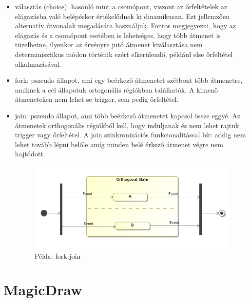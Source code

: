 \begin{itemize}
	\item választás (choice): hasonló mint a csomópont, viszont az őrfeltételek az elágazásba való belépéskor értékelődnek ki dinamikusan. Ezt jellemzően alternatív útvonalak megadására használjuk. Fontos megjegyezni, hogy az elágazás és a csomópont esetében is lehetséges, hogy több átmenet is tüzelhetne, ilyenkor az érvényre jutó átmenet kiválasztása nem determinisztikus módon történik ezért elkerülendő, például else őrfeltétel alkalmazásával.
	\item fork: pszeudo állapot, ami egy beérkező átmenetet szétbont több átmenetre, amiknek a cél állapotuk ortogonális régiókban találhatók. A kimenő átmeneteken nem lehet se trigger, sem pedig őrfeltétel.
	\item join: pszeudo állapot, ami több beérkező átmenetet kapcsol össze eggyé. Az átmenetek orthogonális régiókból kell, hogy induljanak és nem lehet rajtuk trigger vagy őrfeltétel. A join szinkronizációs funkcionalitással bír: addig nem lehet tovább lépni belőle amíg minden belé érkező átmenet végre nem hajtódott.
	\begin{figure}[!ht]
		\centering
		\includegraphics[keepaspectratio]{figures/statechart_elements/forkjoin.png}
		\caption{Példa: fork-join}
	\end{figure}
	
\end{itemize}

\section{MagicDraw}

